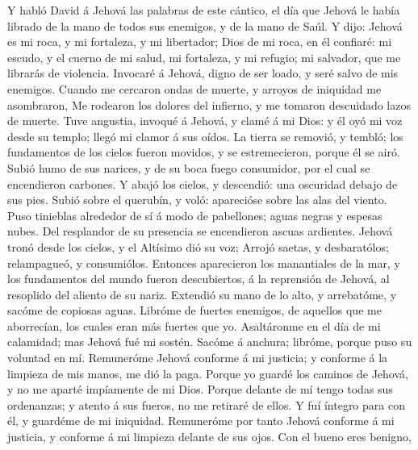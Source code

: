  Y habló David á Jehová las palabras de este cántico, el
día que Jehová le había librado de la mano de todos sus enemigos, y de
la mano de Saúl.  Y dijo: Jehová es mi roca, y mi
fortaleza, y mi libertador;  Dios de mi roca, en él
confiaré: mi escudo, y el cuerno de mi salud, mi fortaleza, y mi
refugio; mi salvador, que me librarás de violencia. 
Invocaré á Jehová, digno de ser loado, y seré salvo de mis enemigos.
 Cuando me cercaron ondas de muerte, y arroyos de
iniquidad me asombraron,  Me rodearon los dolores del
infierno, y me tomaron descuidado lazos de muerte.  Tuve
angustia, invoqué á Jehová, y clamé á mi Dios: y él oyó mi voz desde su
templo; llegó mi clamor á sus oídos.  La tierra se
removió, y tembló; los fundamentos de los cielos fueron movidos, y se
estremecieron, porque él se airó.  Subió humo de sus
narices, y de su boca fuego consumidor, por el cual se encendieron
carbones.  Y abajó los cielos, y descendió: una oscuridad
debajo de sus pies.  Subió sobre el querubín, y voló:
aparecióse sobre las alas del viento.  Puso tinieblas
alrededor de sí á modo de pabellones; aguas negras y espesas nubes.
 Del resplandor de su presencia se encendieron ascuas
ardientes.  Jehová tronó desde los cielos, y el Altísimo
dió su voz;  Arrojó saetas, y desbaratólos; relampagueó,
y consumiólos.  Entonces aparecieron los manantiales de
la mar, y los fundamentos del mundo fueron descubiertos, á la reprensión
de Jehová, al resoplido del aliento de su nariz. 
Extendió su mano de lo alto, y arrebatóme, y sacóme de copiosas aguas.
 Libróme de fuertes enemigos, de aquellos que me
aborrecían, los cuales eran más fuertes que yo. 
Asaltáronme en el día de mi calamidad; mas Jehová fué mi sostén.
 Sacóme á anchura; libróme, porque puso su voluntad en
mí.  Remuneróme Jehová conforme á mi justicia; y conforme
á la limpieza de mis manos, me dió la paga.  Porque yo
guardé los caminos de Jehová, y no me aparté impíamente de mi Dios.
 Porque delante de mí tengo todas sus ordenanzas; y
atento á sus fueros, no me retiraré de ellos.  Y fuí
íntegro para con él, y guardéme de mi iniquidad. 
Remuneróme por tanto Jehová conforme á mi justicia, y conforme á mi
limpieza delante de sus ojos.  Con el bueno eres benigno,
